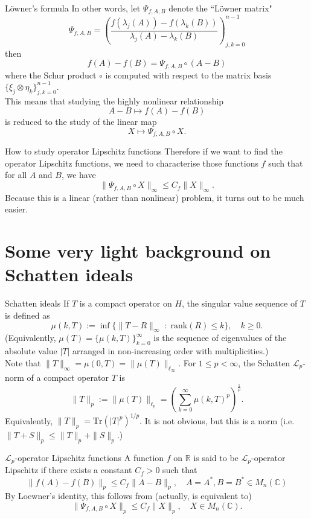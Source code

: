 \documentclass{beamer}
\numberwithin{equation}{section}
\theoremstyle{plain}
\theoremstyle{plain}
\theoremstyle{definition}
\theoremstyle{plain}
\theoremstyle{plain}
\theoremstyle{definition}
\newcommand{\Rl}{\mathbb{R}}
\newcommand{\Cplx}{\mathbb{C}}
\newcommand{\Lc}{\mathcal{L}}
\newcommand{\Tr}{\mathrm{Tr}}
\begin{document}
\begin{frame}{L\"{o}wner's formula}
    In other words, let $\Psi_{f,A,B}$ denote the ``L\"{o}wner matrix"
    \[
        \Psi_{f,A,B} = \left(\frac{f(\lambda_j(A))-f(\lambda_k(B))}{\lambda_j(A)-\lambda_k(B)}\right)_{j,k=0}^{n-1}
    \]
    then
    \[
        f(A)-f(B) = \Psi_{f,A,B} \circ (A-B)
    \]
    where the Schur product $\circ$ is computed with respect to the matrix basis $\{\xi_j\otimes \eta_k\}_{j,k=0}^{n-1}.$\\
    \pause
    This means that studying the highly nonlinear relationship
    \[
        A-B \mapsto f(A)-f(B)
    \]
    is reduced to the study of the linear map
    \[
        X\mapsto \Psi_{f,A,B}\circ X.
    \]
\end{frame}

\begin{frame}{How to study operator Lipschitz functions}
    Therefore if we want to find the operator Lipschitz functions, we need to characterise
    those functions $f$ such that for all $A$ and $B$, we have
    \[
        \|\Psi_{f,A,B}\circ X \|_{\infty} \leq C_f\|X\|_{\infty}.
    \]
    Because this is a linear (rather than nonlinear) problem, it turns out to be much easier.
\end{frame}

\section{Some very light background on Schatten ideals}

\begin{frame}{Schatten ideals}
    If $T$ is a compact operator on $H$, the singular value sequence of $T$ is defined as
    $$
        \mu(k,T) := \inf\{\|T-R\|_{\infty}\;:\;\mathrm{rank}(R)\leq k\},\quad k\geq 0.
    $$
    (Equivalently, $\mu(T) = \{\mu(k,T)\}_{k=0}^\infty$ is the sequence of eigenvalues of the absolute value $|T|$ arranged in non-increasing order with multiplicities.)\\
    \pause
    Note that $\|T\|_\infty = \mu(0,T) = \|\mu(T)\|_{\ell_\infty}.$
    \pause
    For $1\leq p < \infty$, the Schatten $\Lc_p$-norm of a compact operator $T$ is
    $$
        \|T\|_p := \|\mu(T)\|_{\ell_p} = \left(\sum_{k=0}^\infty \mu(k,T)^p\right)^{\frac1p}.
    $$
    Equivalently, $\|T\|_p = \Tr(|T|^p)^{1/p}.$
    It is not obvious, but this is a norm (i.e. $\|T+S\|_p\leq \|T\|_p+\|S\|_p.$)
\end{frame}

\begin{frame}{$\Lc_p$-operator Lipschitz functions}
    A function $f$ on $\Rl$ is said to be $\Lc_p$-operator Lipschitz if there exists a constant $C_f>0$ such that
    $$
        \|f(A)-f(B)\|_p \leq C_f\|A-B\|_p,\quad A=A^*,B=B^* \in M_n(\Cplx)
    $$
    By Loewner's identity, this follows from (actually, is equivalent to)
    \[
        \|\Psi_{f,A,B}\circ X\|_p \leq C_f\|X\|_p,\quad X\in M_n(\Cplx).
    \]
\end{frame}
\end{document}
